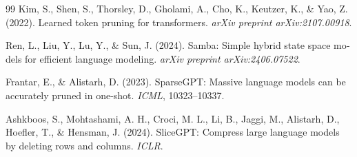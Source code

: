 \documentclass[12pt,a4paper]{report}
\theoremstyle{definition}
\begin{document}
\begin{latin}
\begin{thebibliography}{99}
Kim, S., Shen, S., Thorsley, D., Gholami, A., Cho, K., Keutzer, K., \& Yao, Z. (2022).
Learned token pruning for transformers.
\textit{arXiv preprint arXiv:2107.00918}.

Ren, L., Liu, Y., Lu, Y., \& Sun, J. (2024).
Samba: Simple hybrid state space models for efficient language modeling.
\textit{arXiv preprint arXiv:2406.07522}.

Frantar, E., \& Alistarh, D. (2023).
SparseGPT: Massive language models can be accurately pruned in one-shot.
\textit{ICML}, 10323--10337.

Ashkboos, S., Mohtashami, A. H., Croci, M. L., Li, B., Jaggi, M., Alistarh, D., Hoefler, T., \& Hensman, J. (2024).
SliceGPT: Compress large language models by deleting rows and columns.
\textit{ICLR}.


\end{thebibliography}
\end{latin}
\end{document}
